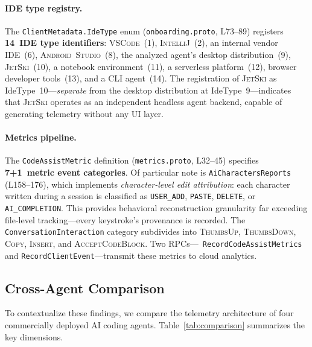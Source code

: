 \documentclass[sigconf,anonymous]{acmart}
\newcommand{\jetski}{\textsc{JetSki}\xspace}
\begin{document}
\paragraph{IDE type registry.}
The \texttt{ClientMetadata.IdeType} enum (\texttt{onboarding.proto},
L73--89) registers \textbf{14~IDE type identifiers}:
\textsc{VSCode}~(1), \textsc{IntelliJ}~(2), an internal vendor
IDE~(6), \textsc{Android~Studio}~(8), the analyzed agent's desktop
distribution~(9), \jetski~(10), a notebook environment~(11), a
serverless platform~(12), browser developer tools~(13), and a CLI
agent~(14).  The registration of \jetski as IdeType~10---\emph{separate}
from the desktop distribution at IdeType~9---indicates that \jetski
operates as an independent headless agent backend, capable of
generating telemetry without any UI layer.

\paragraph{Metrics pipeline.}
The \texttt{CodeAssistMetric} definition (\texttt{metrics.proto},
L32--45) specifies \textbf{7+1~metric event categories}.
Of particular note is \texttt{AiCharactersReports} (L158--176), which
implements \emph{character-level edit attribution}: each character
written during a session is classified as \texttt{USER\_ADD},
\texttt{PASTE}, \texttt{DELETE}, or \texttt{AI\_COMPLETION}.
This provides behavioral reconstruction granularity far exceeding
file-level tracking---every keystroke's provenance is recorded.
The \texttt{ConversationInteraction} category subdivides into
\textsc{ThumbsUp}, \textsc{ThumbsDown}, \textsc{Copy},
\textsc{Insert}, and \textsc{AcceptCodeBlock}.  Two RPCs---\texttt{%
RecordCodeAssistMetrics} and \texttt{RecordClientEvent}---transmit
these metrics to cloud analytics.

\subsection{Cross-Agent Comparison}\label{sec:comparison}

To contextualize these findings, we compare the telemetry architecture
of four commercially deployed AI coding agents.  Table~\ref{tab:comparison}
summarizes the key dimensions.
\end{document}
